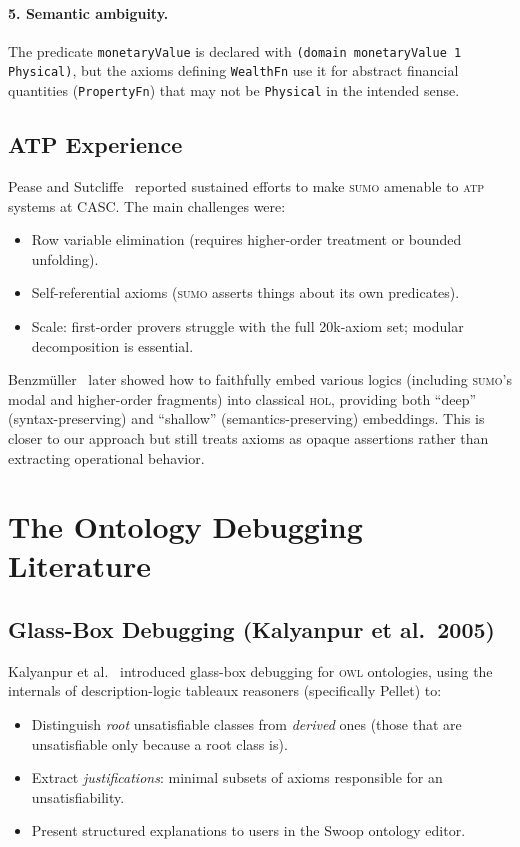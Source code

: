 \documentclass[11pt]{article}
\newcommand{\SUMO}{\textsc{sumo}}
\newcommand{\OWL}{\textsc{owl}}
\newcommand{\HOL}{\textsc{hol}}
\newcommand{\ATP}{\textsc{atp}}
\theoremstyle{definition}
\theoremstyle{plain}
\begin{document}
\paragraph{5. Semantic ambiguity.}
The predicate \texttt{monetaryValue} is declared with
\texttt{(domain monetaryValue 1 Physical)}, but the axioms defining
\texttt{WealthFn} use it for abstract financial quantities
(\texttt{PropertyFn}) that may not be \texttt{Physical} in the
intended sense.

\subsection{ATP Experience}

Pease and Sutcliffe~\cite{pease-sutcliffe-2007} reported sustained
efforts to make \SUMO{} amenable to \ATP{} systems at CASC.
The main challenges were:
\begin{itemize}[nosep]
  \item Row variable elimination (requires higher-order treatment or
    bounded unfolding).
  \item Self-referential axioms (\SUMO{} asserts things about its own
    predicates).
  \item Scale: first-order provers struggle with the full 20k-axiom
    set; modular decomposition is essential.
\end{itemize}

Benzm\"uller~\cite{benzmuller-faithful-embeddings} later showed how to
faithfully embed various logics (including \SUMO{}'s modal and
higher-order fragments) into classical \HOL{}, providing both ``deep''
(syntax-preserving) and ``shallow'' (semantics-preserving) embeddings.
This is closer to our approach but still treats axioms as opaque
assertions rather than extracting operational behavior.

\section{The Ontology Debugging Literature}
\label{sec:debugging}

\subsection{Glass-Box Debugging (Kalyanpur et al.~2005)}

Kalyanpur et al.~\cite{kalyanpur2005} introduced glass-box debugging
for \OWL{} ontologies, using the internals of description-logic tableaux
reasoners (specifically Pellet) to:
\begin{itemize}[nosep]
  \item Distinguish \emph{root} unsatisfiable classes from \emph{derived}
    ones (those that are unsatisfiable only because a root class is).
  \item Extract \emph{justifications}: minimal subsets of axioms
    responsible for an unsatisfiability.
  \item Present structured explanations to users in the Swoop
    ontology editor.
\end{itemize}
\end{document}

